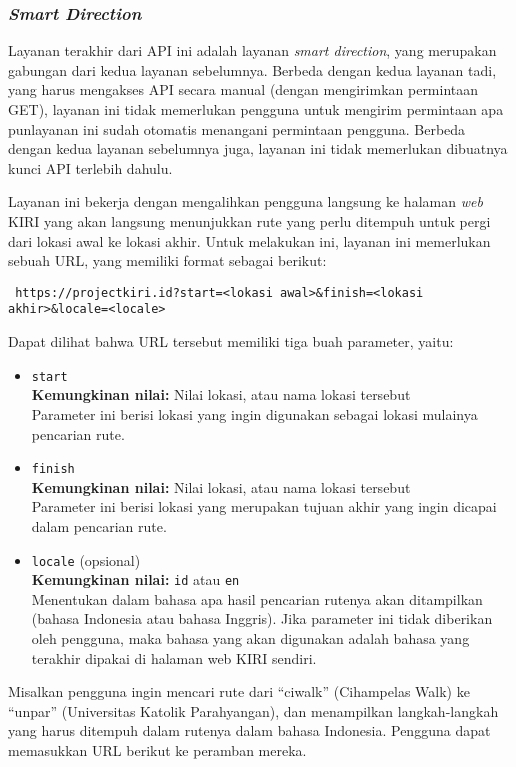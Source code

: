 \subsubsection{\textit{Smart Direction}}
\label{sec:kiri-api-smartdir}

Layanan terakhir dari API ini adalah layanan \textit{smart direction}, yang merupakan gabungan dari kedua layanan sebelumnya. Berbeda dengan kedua layanan tadi, yang harus mengakses API secara manual (dengan mengirimkan permintaan GET), layanan ini tidak memerlukan pengguna untuk mengirim permintaan apa pun\textemdash layanan ini sudah otomatis menangani permintaan pengguna. Berbeda dengan kedua layanan sebelumnya juga, layanan ini tidak memerlukan dibuatnya kunci API terlebih dahulu.

Layanan ini bekerja dengan mengalihkan pengguna langsung ke halaman \textit{web} KIRI yang akan langsung menunjukkan rute yang perlu ditempuh untuk pergi dari lokasi awal ke lokasi akhir. Untuk melakukan ini, layanan ini memerlukan sebuah URL, yang memiliki format sebagai berikut:

\begin{verbatim}
 https://projectkiri.id?start=<lokasi awal>&finish=<lokasi akhir>&locale=<locale>
\end{verbatim}
\noindent
Dapat dilihat bahwa URL tersebut memiliki tiga buah parameter, yaitu:

\begin{itemize}
	\item \verb|start|\\
	\textbf{Kemungkinan nilai:} Nilai \latlon\xspace lokasi, atau nama lokasi tersebut\\
	Parameter ini berisi lokasi yang ingin digunakan sebagai lokasi mulainya pencarian rute.
	\item \verb|finish|\\
	\textbf{Kemungkinan nilai:} Nilai \latlon\xspace lokasi, atau nama lokasi tersebut\\
	Parameter ini berisi lokasi yang merupakan tujuan akhir yang ingin dicapai dalam pencarian rute.
	\item \verb|locale| (opsional)\\
	\textbf{Kemungkinan nilai:} \verb|id| atau \verb|en|\\
	Menentukan dalam bahasa apa hasil pencarian rutenya akan ditampilkan (bahasa Indonesia atau bahasa Inggris). Jika parameter ini tidak diberikan oleh pengguna, maka bahasa yang akan digunakan adalah bahasa yang terakhir dipakai di halaman web KIRI sendiri.
\end{itemize}
\vspace{\baselineskip}\noindent
Misalkan pengguna ingin mencari rute dari ``ciwalk'' (Cihampelas Walk) ke ``unpar'' (Universitas Katolik Parahyangan), dan menampilkan langkah-langkah yang harus ditempuh dalam rutenya dalam bahasa Indonesia. Pengguna dapat memasukkan URL berikut ke peramban mereka.

